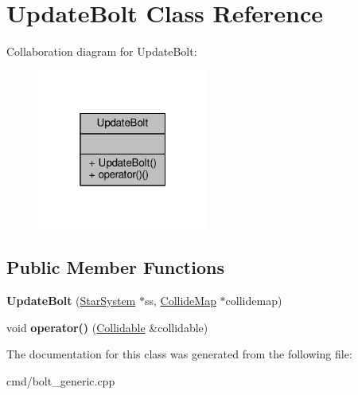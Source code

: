 \hypertarget{classUpdateBolt}{}\section{Update\+Bolt Class Reference}
\label{classUpdateBolt}


Collaboration diagram for Update\+Bolt\+:
\nopagebreak
\begin{figure}[H]
\begin{center}
\leavevmode
\includegraphics[width=160pt]{d4/dae/classUpdateBolt__coll__graph}
\end{center}
\end{figure}
\subsection*{Public Member Functions}
\begin{DoxyCompactItemize}
\item 
{\bfseries Update\+Bolt} (\hyperlink{classStarSystem}{Star\+System} $\ast$ss, \hyperlink{classCollideMap}{Collide\+Map} $\ast$collidemap)\hypertarget{classUpdateBolt_a0ac60d87f9bef6e881cd9b51bfcffffe}{}\label{classUpdateBolt_a0ac60d87f9bef6e881cd9b51bfcffffe}

\item 
void {\bfseries operator()} (\hyperlink{classCollidable}{Collidable} \&collidable)\hypertarget{classUpdateBolt_a59af4da7b873828a14e9bd382a3d8a66}{}\label{classUpdateBolt_a59af4da7b873828a14e9bd382a3d8a66}

\end{DoxyCompactItemize}


The documentation for this class was generated from the following file\+:\begin{DoxyCompactItemize}
\item 
cmd/bolt\+\_\+generic.\+cpp\end{DoxyCompactItemize}

